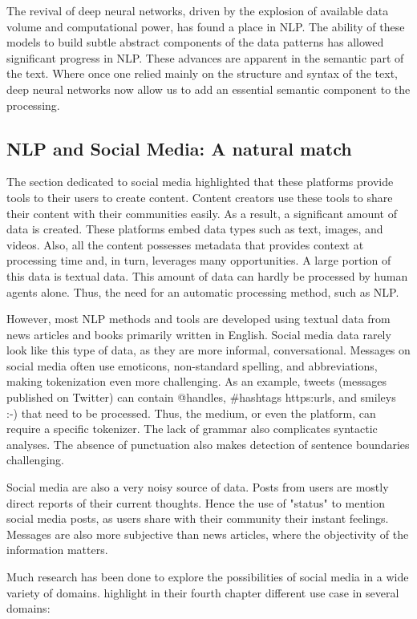 The revival of deep neural networks, driven by the explosion of available data volume and computational power, has found a place in NLP.
The ability of these models to build subtle abstract components of the data patterns has allowed significant progress in NLP.
These advances are apparent in the semantic part of the text.
Where once one relied mainly on the structure and syntax of the text, deep neural networks now allow us to add an essential semantic component to the processing.

\subsection{NLP and Social Media: A natural match}
The section dedicated to social media highlighted that these platforms provide tools to their users to create content.
Content creators use these tools to share their content with their communities easily.
As a result, a significant amount of data is created.
These platforms embed data types such as text, images, and videos.
Also, all the content possesses metadata that provides context at processing time and, in turn, leverages many opportunities.
A large portion of this data is textual data.
This amount of data can hardly be processed by human agents alone.
Thus, the need for an automatic processing method, such as NLP.

However, most NLP methods and tools are developed using textual data from news articles and books primarily written in English.
Social media data rarely look like this type of data, as they are more informal, conversational.
Messages on social media often use emoticons, non-standard spelling, and abbreviations, making tokenization even more challenging.
As an example, tweets (messages published on Twitter) can contain @handles, \#hashtags https:\/\/urls, and smileys :-) that need to be processed.
Thus, the medium, or even the platform, can require a specific tokenizer.
The lack of grammar also complicates syntactic analyses.
The absence of punctuation also makes detection of sentence boundaries challenging.

Social media are also a very noisy source of data.
Posts from users are mostly direct reports of their current thoughts.
Hence the use of "status" to mention social media posts, as users share with their community their instant feelings.
Messages are also more subjective than news articles, where the objectivity of the information matters.

Much research has been done to explore the possibilities of social media in a wide variety of domains.
highlight in their fourth chapter different use case in several domains:

